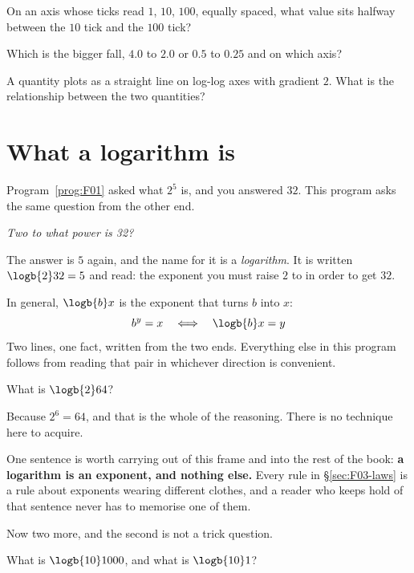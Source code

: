 \begin{quiz}
\item On an axis whose ticks read $1$, $10$, $100$, equally spaced, what value
  sits halfway between the $10$ tick and the $100$ tick? 
\item Which is the bigger fall, $\num{4.0}$ to $\num{2.0}$ or $\num{0.5}$ to
  $\num{0.25}$ \dash{} and on which axis? 
\item A quantity plots as a straight line on log-log axes with gradient $2$. What
  is the relationship between the two quantities? 
\end{quiz}

\section{What a logarithm is}
\label{sec:F03-what}

\begin{fr}
Program~\ref{prog:F01} asked what $2^{5}$ is, and you answered $32$. This
program asks the same question from the other end.

\emph{Two to what power is 32?}

The answer is $5$ again, and the name for it is a \emph{logarithm}. It is
written $\logb{2} 32 = 5$ and read: the exponent you must raise $2$ to in order
to get $32$.

In general, $\logb{b} x$ is the exponent that turns $b$ into $x$:
\[ b^{y} = x \quad\Longleftrightarrow\quad \logb{b} x = y \]
Two lines, one fact, written from the two ends. Everything else in this program
follows from reading that pair in whichever direction is convenient.

What is $\logb{2} 64$?
\nextframe
\end{fr}

\begin{fr}
Because $2^{6} = 64$, and that is the whole of the reasoning. There is no
technique here to acquire.

One sentence is worth carrying out of this frame and into the rest of the book:
\textbf{a logarithm is an exponent, and nothing else.} Every rule in
\S\ref{sec:F03-laws} is a rule about exponents wearing different clothes, and a
reader who keeps hold of that sentence never has to memorise one of them.

Now two more, and the second is not a trick question.

What is $\logb{10} 1000$, and what is $\logb{10} 1$?
\nextframe
\end{fr}

